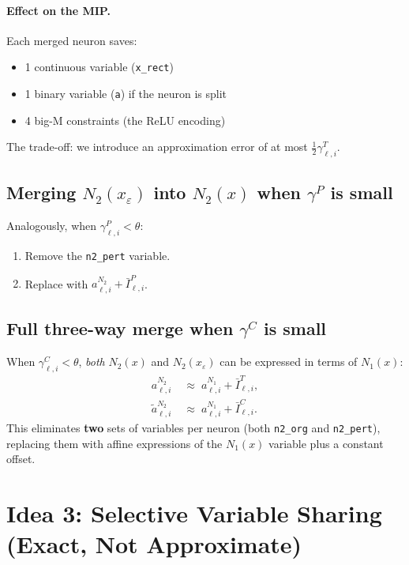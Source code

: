 \documentclass[11pt]{article}
\newcommand{\layerl}{\ell}
\begin{document}
\paragraph{Effect on the MIP.}
Each merged neuron saves:
\begin{itemize}
    \item 1 continuous variable (\texttt{x\_rect})
    \item 1 binary variable (\texttt{a}) if the neuron is split
    \item 4 big-M constraints (the ReLU encoding)
\end{itemize}
The trade-off: we introduce an approximation error of at most $\frac{1}{2}\gamma^T_{\layerl,i}$.

\subsection{Merging $N_2(x_\varepsilon)$ into $N_2(x)$ when $\gamma^P$ is small}

Analogously, when $\gamma^P_{\layerl,i} < \theta$:
\begin{enumerate}
    \item Remove the \texttt{n2\_pert} variable.
    \item Replace with $a^{N_2}_{\layerl,i} + \bar{I}^P_{\layerl,i}$.
\end{enumerate}

\subsection{Full three-way merge when $\gamma^C$ is small}

When $\gamma^C_{\layerl,i} < \theta$, \emph{both} $N_2(x)$ and $N_2(x_\varepsilon)$
can be expressed in terms of $N_1(x)$:
\begin{align}
    a^{N_2}_{\layerl,i}          &\;\approx\; a^{N_1}_{\layerl,i} + \bar{I}^T_{\layerl,i}, \\
    \tilde{a}^{N_2}_{\layerl,i}  &\;\approx\; a^{N_1}_{\layerl,i} + \bar{I}^C_{\layerl,i}.
\end{align}
This eliminates \textbf{two} sets of variables per neuron (both \texttt{n2\_org}
and \texttt{n2\_pert}), replacing them with affine expressions of the $N_1(x)$
variable plus a constant offset.


\section{Idea 3: Selective Variable Sharing (Exact, Not Approximate)}
\label{sec:exact}
\end{document}
